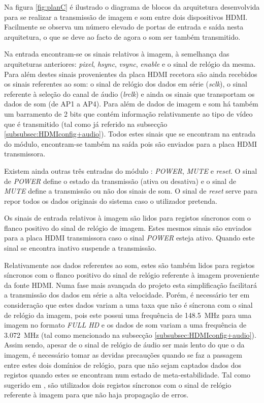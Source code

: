 Na figura \ref{fig:planC} é ilustrado o diagrama de blocos da arquitetura desenvolvida para se realizar a transmissão de imagem e som entre dois dispositivos HDMI. Facilmente se observa um número elevado de portas de entrada e saída nesta arquitetura, o que se deve ao facto de agora o som ser também transmitido.

Na entrada encontram-se os sinais relativos à imagem, à semelhança das arquiteturas anteriores: \textit{pixel}, \textit{hsync}, \textit{vsync}, \textit{enable} e o sinal de relógio da mesma. Para além destes sinais provenientes da placa HDMI recetora são ainda recebidos os sinais referentes ao som: o sinal de relógio dos dados em série (\textit{sclk}), o sinal referente à seleção do canal de áudio (\textit{lrclk}) e ainda os sinais que transportam os dados de som (de AP1 a AP4). Para além de dados de imagem e som há também um barramento de 2 bits que contém informação relativamente ao tipo de vídeo que é transmitido (tal como já referido na subsecção \ref{subsubsec:HDMIconfig+audio}). Todos estes sinais que se encontram na entrada do módulo, encontram-se também na saída pois são enviados para a placa HDMI transmissora.

Existem ainda outras três entradas do módulo : \textit{POWER}, \textit{MUTE} e \textit{reset}. O sinal de \textit{POWER} define o estado da transmissão (ativa ou desativa) e o sinal de \textit{MUTE} define a transmissão ou não dos sinais de som. O sinal de \textit{reset} serve para repor todos os dados originais do sistema caso o utilizador pretenda.

Os sinais de entrada relativos à imagem são lidos para registos síncronos com o flanco positivo do sinal de relógio de imagem. Estes mesmos sinais são enviados para a placa HDMI transmissora caso o sinal \textit{POWER} esteja ativo. Quando este sinal se encontra inativo suspende a transmissão.

Relativamente aos dados referentes ao som, estes são também lidos para registos síncronos com o flanco positivo do sinal de relógio referente à imagem proveniente da fonte HDMI. Numa fase mais avançada do projeto esta simplificação facilitará a transmissão dos dados em série a alta velocidade. Porém, é necessário ter em consideração que estes dados variam a uma taxa que não é síncrona com o sinal de relógio da imagem, pois este possui uma frequência de \SI{148.5}{\mega\hertz} para uma imagem no formato \textit{FULL HD} e os dados de som variam a uma frequência de \SI{3.072}{\mega\hertz} (tal como mencionado na subsecção \ref{subsubsec:HDMIconfig+audio}). Assim sendo, apesar de o sinal de relógio de áudio ser mais lento do que o da imagem, é necessário tomar as devidas precauções quando se faz a passagem entre estes dois domínios de relógio, para que não sejam captados dados dos registos quando estes se encontram num estado de meta-estabilidade. Tal como sugerido em \cite{R024}, são utilizados dois registos síncronos com o sinal de relógio referente à imagem para que não haja propagação de erros.

